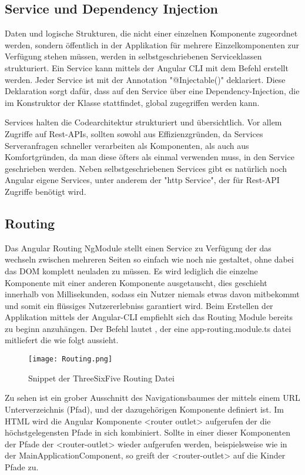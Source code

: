 \subsection{Service und Dependency Injection}
Daten und logische Strukturen, die nicht einer einzelnen Komponente zugeordnet werden, sondern öffentlich in der Applikation für mehrere Einzelkomponenten zur Verfügung stehen müssen, werden in selbstgeschriebenen Serviceklassen strukturiert. Ein Service kann mittels der Angular CLI mit dem Befehl  erstellt werden. Jeder Service ist mit der Annotation "@Injectable()" deklariert. Diese Deklaration sorgt dafür, dass auf den Service über eine Dependency-Injection, die im Konstruktor der Klasse stattfindet, global zugegriffen werden kann.

Services halten die Codearchitektur strukturiert und übersichtlich. Vor allem Zugriffe auf Rest-APIs, sollten sowohl aus Effizienzgründen, da Services Serveranfragen schneller verarbeiten als Komponenten, als auch aus Komfortgründen, da man diese öfters als einmal verwenden muss, in den Service geschrieben werden. Neben selbstgeschriebenen Services gibt es natürlich noch Angular eigene Services, unter anderem der "http Service", der für Rest-API Zugriffe benötigt wird.
\subsection{Routing}
Das Angular Routing\cite{RouterAndNavigation} NgModule stellt einen Service zu Verfügung der das wechseln zwischen mehreren Seiten so einfach wie noch nie gestaltet, ohne dabei das DOM komplett neuladen zu müssen. Es wird lediglich die einzelne Komponente mit einer anderen Komponente ausgetauscht, dies geschieht innerhalb von Millisekunden, sodass ein Nutzer niemals etwas davon mitbekommt und somit ein flüssiges Nutzererlebniss garantiert wird. Beim Erstellen der Applikation mittels der Angular-CLI empfiehlt sich das Routing Module bereits zu beginn anzuhängen. Der Befehl lautet , der eine app-routing.module.ts datei mitliefert die wie folgt aussieht.
\begin{figure}[H] \centering \texttt{[image: Routing.png]} \caption{Snippet der ThreeSixFive Routing Datei} \end{figure}
Zu sehen ist ein grober Ausschnitt des Navigationsbaumes der mittels einem URL Unterverzeichnis (Pfad), und der dazugehörigen Komponente definiert ist. Im HTML wird die Angular Komponente <router outlet> aufgerufen der die höchstgelegensten Pfade in sich kombiniert. Sollte in einer dieser Komponenten der Pfade der <router-outlet> wieder aufgerufen werden, beispielsweise wie in der MainApplicationComponent, so greift der <router-outlet> auf die Kinder Pfade zu.


